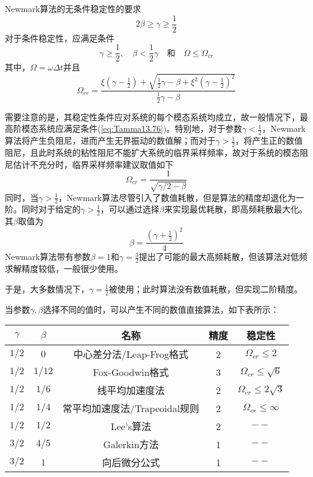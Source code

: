 Newmark算法的无条件稳定性的要求
\begin{equation}
2\beta\ge\gamma\ge\frac{1}{2}
\end{equation}
对于条件稳定性，应满足条件
\begin{equation}
\gamma\ge\frac{1}{2},\quad\beta<\frac{1}{2}\gamma\quad\text{和}\quad\Omega\le\Omega_{cr}
\end{equation}
其中，$\Omega=\omega\Delta t$并且
\begin{equation}
\Omega_{cr}=\frac{\xi(\gamma-\frac{1}{2})+\sqrt{\frac{1}{2}\gamma-\beta+\xi^2(\gamma-\frac12)^2}}{\frac{1}{2}\gamma-\beta}\label{eq:Tamma13.76}
\end{equation}

需要注意的是，其稳定性条件应对系统的每个模态系统均成立，故一般情况下，最高阶模态系统应满足条件(\ref{eq:Tamma13.76})。特别地，对于参数$\gamma<\frac{1}{2}$，Newmark算法将产生负阻尼，进而产生无界振动的数值解；而对于$\gamma>\frac{1}{2}$，将产生正的数值阻尼，且此时系统的粘性阻尼不能扩大系统的临界采样频率，故对于系统的模态阻尼估计不充分时，临界采样频率建议取值如下
\begin{equation}
\Omega_{cr}=\frac{1}{\sqrt{\gamma/2-\beta}}
\end{equation}
同时，当$\gamma>\frac12$，Newmark算法尽管引入了数值耗散，但是算法的精度却退化为一阶。同时对于给定的$\gamma>\frac{1}{2}$，可以通过选择$\beta$来实现最优耗散，即高频耗散最大化。其$\beta$取值为
\begin{equation}
\beta=\frac{(\gamma+\frac{1}{2})^2}{4}
\end{equation}
Newmark算法带有参数$\beta=1$和$\gamma=\frac{3}{2}$提出了可能的最大高频耗散，但该算法对低频求解精度较低，一般很少使用。

于是，大多数情况下，$\gamma=\frac{1}{2}$被使用；此时算法没有数值耗散，但实现二阶精度。

当参数$\gamma,\beta$选择不同的值时，可以产生不同的数值直接算法，如下表所示：
\begin{table}[htbp]
\vspace{0.5em}\centering\wuhao
\begin{tabular}{ccccc}
\toprule[1.5pt]
$\gamma$&$\beta$&名称&精度&稳定性\\
\midrule[1pt]
$1/2$ & $0$ & 中心差分法/Leap-Frog格式 & 2 & $\Omega_{cr}\le2$\\
$1/2$ & $1/12$ & Fox-Goodwin格式 & 3 & $\Omega_{cr}\le\sqrt{6}$\\
$1/2$ & $1/6$ & 线平均加速度法 & 2 & $\Omega_{cr}\le2\sqrt{3}$\\
$1/2$ & $1/4$ & 常平均加速度法/Trapeoidal规则 & 2 & $\Omega_{cr}\le\infty$\\
$1/2$ & $1/2$ & Lee's算法\cite{Lees1966a} & 2 & $--$\\
$3/2$ & $4/5$ & Galerkin方法 & 1 & $--$\\
$3/2$ & $1$ & 向后微分公式 & 1 & $--$\\
\bottomrule[1.5pt]
\end{tabular}
\end{table}

